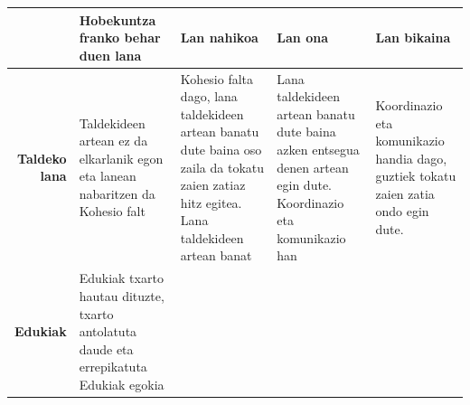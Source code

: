 \documentclass[
]{book}
\begin{document}
\begin{longtable}[]{@{}rllll@{}}
\toprule
\begin{minipage}[b]{0.11\columnwidth}\raggedleft
\strut
\end{minipage} & \begin{minipage}[b]{0.19\columnwidth}\raggedright
\textbf{Hobekuntza franko behar duen lana}\strut
\end{minipage} & \begin{minipage}[b]{0.19\columnwidth}\raggedright
\textbf{Lan nahikoa}\strut
\end{minipage} & \begin{minipage}[b]{0.19\columnwidth}\raggedright
\textbf{Lan ona}\strut
\end{minipage} & \begin{minipage}[b]{0.19\columnwidth}\raggedright
\textbf{Lan bikaina}\strut
\end{minipage}\tabularnewline
\midrule
\endhead
\begin{minipage}[t]{0.11\columnwidth}\raggedleft
\textbf{Taldeko lana}\strut
\end{minipage} & \begin{minipage}[t]{0.19\columnwidth}\raggedright
Taldekideen artean ez da elkarlanik egon eta lanean nabaritzen da \textbar{} Kohesio falt\strut
\end{minipage} & \begin{minipage}[t]{0.19\columnwidth}\raggedright
Kohesio falta dago, lana taldekideen artean banatu dute baina oso zaila da tokatu zaien zatiaz hitz egitea. \textbar{} Lana taldekideen artean banat\strut
\end{minipage} & \begin{minipage}[t]{0.19\columnwidth}\raggedright
Lana taldekideen artean banatu dute baina azken entsegua denen artean egin dute. \textbar{} Koordinazio eta komunikazio han\strut
\end{minipage} & \begin{minipage}[t]{0.19\columnwidth}\raggedright
Koordinazio eta komunikazio handia dago, guztiek tokatu zaien zatia ondo egin dute. \textbar{}\strut
\end{minipage}\tabularnewline
\begin{minipage}[t]{0.11\columnwidth}\raggedleft
\textbf{Edukiak}\strut
\end{minipage} & \begin{minipage}[t]{0.19\columnwidth}\raggedright
Edukiak txarto hautau dituzte, txarto antolatuta daude eta errepikatuta \textbar{} Edukiak egokia\strut

\end{minipage}
\end{longtable}
\end{document}
